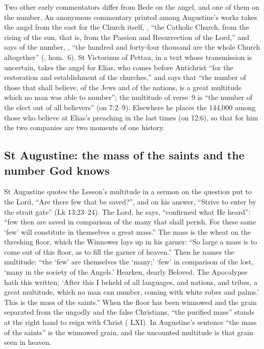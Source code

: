 Two other early commentators differ from Bede on the angel, and one of them
on the number. An anonymous commentary printed among Augustine's works takes
the angel from the east for the Church itself, , ``the
Catholic Church, from the rising of the sun, that is, from the Passion and
Resurrection of the Lord,'' and says of the number, , ``the hundred and forty-four
thousand are the whole Church altogether'' (,
hom.~6). St Victorinus of Pettau, in a text whose transmission is uncertain,
takes the angel for Elias, who comes before Antichrist ``for the restoration
and establishment of the churches,'' and says that ``the number of those that
shall believe, of the Jews and of the nations, is a great multitude which no
man was able to number''; the multitude of verse~9 is ``the number of the
elect out of all believers'' (on 7:2--9). Elsewhere he places the 144,000
among those who believe at Elias's preaching in the last times (on 12:6), so
that for him the two companies are two moments of one history.

\subsection{St Augustine: the mass of the saints and the number God knows}
\label{sec:sealed-augustine}

St Augustine quotes the Lesson's multitude in a sermon on the question put to
the Lord, ``Are there few that be saved?'', and on his answer, ``Strive to
enter by the strait gate'' (Lk 13:23--24). The Lord, he says, ``confirmed what
He heard'': ``few then are saved in comparison of the many that shall perish.
For these same `few' will constitute in themselves a great mass.'' The mass is
the wheat on the threshing floor, which the Winnower lays up in his garner:
``So large a mass is to come out of this floor, as to fill the garner of
heaven.'' Then he names the multitude: ``the `few' are themselves the `many;'
`few' in comparison of the lost, `many in the society of the Angels.' Hearken,
dearly Beloved. The Apocalypse hath this written; `After this I beheld of all
languages, and nations, and tribes, a great multitude, which no man can number,
coming with white robes and palms.' This is the mass of the saints.'' When the
floor has been winnowed and the grain separated from the ungodly and the false
Christians, ``the purified mass'' stands at the right hand to reign with
Christ ( LXI). In Augustine's sentence ``the mass of the saints''
is the winnowed grain, and the uncounted multitude is that grain seen in
heaven.

